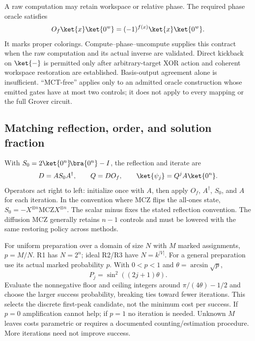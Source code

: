 \documentclass[sigconf, natbib]{acmart}
\begin{document}
A raw computation may retain workspace or relative phase. The required phase oracle satisfies
\begin{equation}
 O_f\ket{x}\ket{0^w}=(-1)^{f(x)}\ket{x}\ket{0^w}.
 \label{eq:phase-contract}
\end{equation}
It marks proper colorings. Compute--phase--uncompute supplies this contract when the raw computation and its actual inverse are validated. Direct kickback on $\ket{-}$ is permitted only after arbitrary-target XOR action and coherent workspace restoration are established. Basis-output agreement alone is insufficient. ``MCT-free'' applies only to an admitted oracle construction whose emitted gates have at most two controls; it does not apply to every mapping or the full Grover circuit.

\subsection{Matching reflection, order, and solution fraction}
\label{subsec:assembly}
With $S_0=2\ket{0^n}\!\bra{0^n}-I$, the reflection and iterate are
\begin{equation}
 D=A S_0 A^\dagger,\qquad Q=D O_f,\qquad
 \ket{\psi_j}=Q^j A\ket{0^n}.
 \label{eq:grover-order}
\end{equation}
Operators act right to left: initialize once with $A$, then apply $O_f$, $A^\dagger$, $S_0$, and $A$ for each iteration. In the convention where MCZ flips the all-ones state,
$S_0=-X^{\otimes n}\mathrm{MCZ}X^{\otimes n}$.
The scalar minus fixes the stated reflection convention. The diffusion MCZ generally retains $n-1$ controls and must be lowered with the same restoring policy across methods.

For uniform preparation over a domain of size $N$ with $M$ marked assignments, $p=M/N$. R1 has $N=2^n$; ideal R2/R3 have $N=k^{|V|}$. For a general preparation use its actual marked probability $p$. With $0<p<1$ and $\theta=\arcsin\sqrt{p}$,
\begin{equation}
 P_j=\sin^2((2j+1)\theta).
 \label{eq:success}
\end{equation}
Evaluate the nonnegative floor and ceiling integers around $\pi/(4\theta)-1/2$ and choose the larger success probability, breaking ties toward fewer iterations. This selects the discrete first-peak candidate, not the minimum cost per success. If $p=0$ amplification cannot help; if $p=1$ no iteration is needed. Unknown $M$ leaves costs parametric or requires a documented counting/estimation procedure. More iterations need not improve success.
\end{document}
